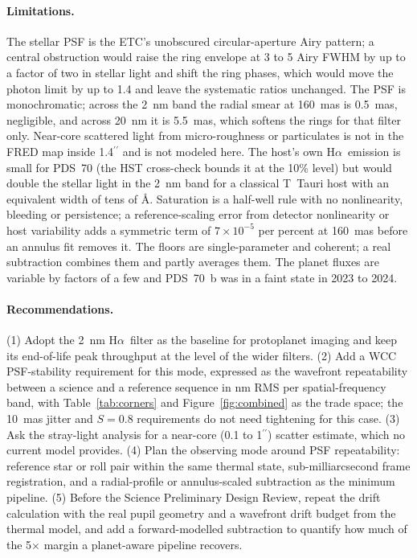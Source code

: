 \documentclass[11pt]{article}
\newcommand{\Ha}{H$\alpha$}
\begin{document}
\paragraph{Limitations.} The stellar PSF is the ETC's unobscured circular-aperture Airy pattern; a central obstruction would raise the ring envelope at 3 to 5 Airy FWHM by up to a factor of two in stellar light and shift the ring phases, which would move the photon limit by up to 1.4 and leave the systematic ratios unchanged. The PSF is monochromatic; across the 2~nm band the radial smear at 160~mas is 0.5~mas, negligible, and across 20~nm it is 5.5~mas, which softens the rings for that filter only. Near-core scattered light from micro-roughness or particulates is not in the FRED map inside 1.4$^{\prime\prime}$ and is not modeled here. The host's own \Ha\ emission is small for PDS~70 (the HST cross-check bounds it at the 10\% level) but would double the stellar light in the 2~nm band for a classical T~Tauri host with an equivalent width of tens of \AA. Saturation is a half-well rule with no nonlinearity, bleeding or persistence; a reference-scaling error from detector nonlinearity or host variability adds a symmetric term of $7 \times 10^{-5}$ per percent at 160~mas before an annulus fit removes it. The floors are single-parameter and coherent; a real subtraction combines them and partly averages them. The planet fluxes are variable by factors of a few and PDS~70~b was in a faint state in 2023 to 2024.

\paragraph{Recommendations.} (1) Adopt the 2~nm \Ha\ filter as the baseline for protoplanet imaging and keep its end-of-life peak throughput at the level of the wider filters. (2) Add a WCC PSF-stability requirement for this mode, expressed as the wavefront repeatability between a science and a reference sequence in nm RMS per spatial-frequency band, with Table~\ref{tab:corners} and Figure~\ref{fig:combined} as the trade space; the 10~mas jitter and $S = 0.8$ requirements do not need tightening for this case. (3) Ask the stray-light analysis for a near-core (0.1 to 1$^{\prime\prime}$) scatter estimate, which no current model provides. (4) Plan the observing mode around PSF repeatability: reference star or roll pair within the same thermal state, sub-milliarcsecond frame registration, and a radial-profile or annulus-scaled subtraction as the minimum pipeline. (5) Before the Science Preliminary Design Review, repeat the drift calculation with the real pupil geometry and a wavefront drift budget from the thermal model, and add a forward-modelled subtraction to quantify how much of the 5$\times$ margin a planet-aware pipeline recovers.
\end{document}

